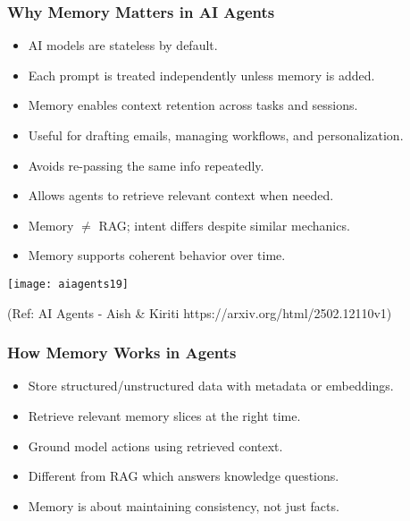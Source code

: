 \begin{frame}[fragile]\frametitle{Why Memory Matters in AI Agents}
\begin{itemize}
  \item AI models are stateless by default.
  \item Each prompt is treated independently unless memory is added.
  \item Memory enables context retention across tasks and sessions.
  \item Useful for drafting emails, managing workflows, and personalization.
  \item Avoids re-passing the same info repeatedly.
  \item Allows agents to retrieve relevant context when needed.
  \item Memory $\neq$ RAG; intent differs despite similar mechanics.
  \item Memory supports coherent behavior over time.
\end{itemize}

\begin{center}
\texttt{[image: aiagents19]}

{\tiny (Ref: AI Agents - Aish \& Kiriti https://arxiv.org/html/2502.12110v1)}

\end{center}	
\end{frame}

\begin{frame}[fragile]\frametitle{How Memory Works in Agents}
\begin{itemize}
  \item Store structured/unstructured data with metadata or embeddings.
  \item Retrieve relevant memory slices at the right time.
  \item Ground model actions using retrieved context.
  \item Different from RAG which answers knowledge questions.
  \item Memory is about maintaining consistency, not just facts.
\end{itemize}
\end{frame}

